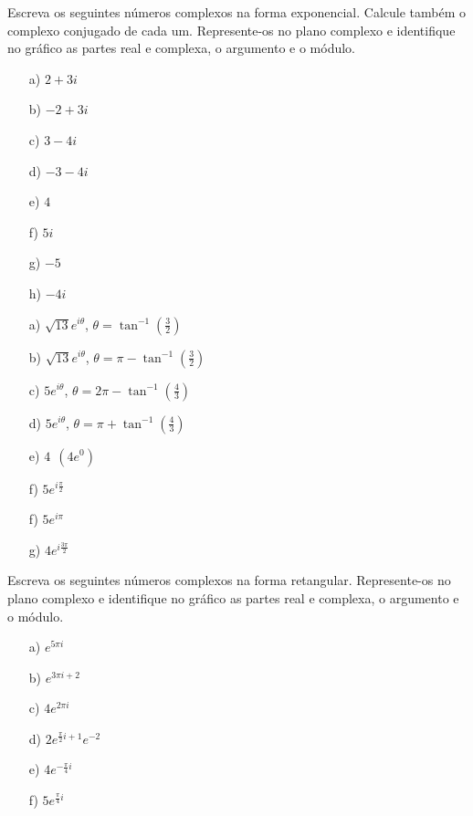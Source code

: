 \begin{Exercise}Escreva os seguintes números complexos na forma exponencial. Calcule também o complexo conjugado de cada um. Represente-os no plano complexo e identifique no gráfico as partes real e complexa, o argumento e o módulo.
\begin{itemize}
\item[a)] $2+3i$
\item[b)] $-2+3i$
\item[c)] $3-4i$
\item[d)] $-3-4i$
\item[e)] $4$
\item[f)] $5i$
\item[g)] $-5$
\item[h)] $-4i$
\end{itemize}
\end{Exercise}
\begin{Answer}
\begin{itemize}
\item[a)] $\sqrt{13}e^{i\theta}$, $\theta=\tan^{-1}\left(\frac{3}{2}\right)$
\item[b)] $\sqrt{13}e^{i\theta}$, $\theta=\pi-\tan^{-1}\left(\frac{3}{2}\right)$
\item[c)] $5e^{i\theta}$, $\theta=2\pi-\tan^{-1}\left(\frac{4}{3}\right)$
\item[d)] $5e^{i\theta}$, $\theta=\pi+\tan^{-1}\left(\frac{4}{3}\right)$
\item[e)] $4~~\left(4e^{0}\right)$
\item[f)] $5e^{i\frac{\pi}{2}}$
\item[f)] $5e^{i\pi}$
\item[g)] $4e^{i\frac{3\pi}{2}}$
\end{itemize}
\end{Answer}
\begin{Exercise}Escreva os seguintes números complexos na forma retangular. Represente-os no plano complexo e identifique no gráfico as partes real e complexa, o argumento e o módulo.
\begin{itemize}
\item[a)] $e^{5\pi i}$
\item[b)] $e^{3\pi i+2}$
\item[c)] $4e^{2\pi i}$
\item[d)] $2e^{\frac{\pi}{2}i+1}e^{-2}$
\item[e)] $4e^{-\frac{\pi}{4}i}$
\item[f)] $5e^{\frac{\pi}{4}i}$
\end{itemize}
\end{Exercise}
